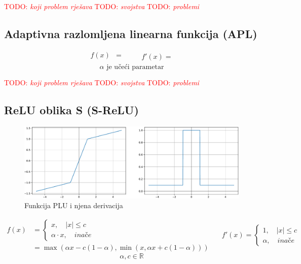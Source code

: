 \documentclass[times, utf8, numeric, diplomski]{fer}
\def\realnum{\mathbb{R}}
\def\otherwise{\textit{inače}}
\def\TODO#1{\noindent\textcolor{red}{TODO: \textit{#1}}\newline}
\def\todo#1{\TODO{#1}}
\def\todoimg#1{\begin{center} \textcolor{red}{\big[ IMAGE: \textit{#1} \big]} \end{center}}
\begin{document}
\todo{koji problem rješava}
\todo{svojstva}
\todo{problemi}

\subsection{Adaptivna razlomljena linearna funkcija (APL)}

\todoimg{}

\begin{equation}
\begin{split}
f(x) &=  \\
\end{split}
\qquad
\begin{split}
f'(x) = 
\end{split}
\end{equation}
\begin{equation*}
\alpha \text{ je učeći parametar}
\end{equation*}

\todo{koji problem rješava}
\todo{svojstva}
\todo{problemi}

\subsection{ReLU oblika S (S-ReLU)}

\begin{figure}[H]
\includegraphics[width=\textwidth]{func_PLU.pdf}
\centering
\caption{Funkcija PLU i njena derivacija}
\end{figure}

\begin{equation}
\begin{split}
f(x) &=
\begin{cases}
x, \quad |x| \leq c \\
\alpha \cdot x, \quad \otherwise
\end{cases} \\
&= \max(\alpha x - c(1-\alpha), \min(x, \alpha x + c (1-\alpha)))
\end{split}
\quad
\begin{split}
f'(x) =
\begin{cases}
1, \quad |x| \leq c \\
\alpha, \quad \otherwise
\end{cases}
\end{split}
\end{equation}
\begin{equation*}
\alpha, c \in \realnum
\end{equation*}
\end{document}
